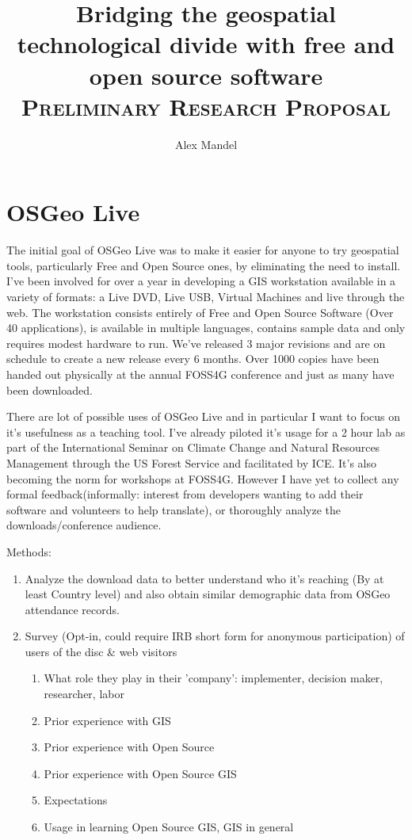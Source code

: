 \documentclass[12pt,letterpaper]{article}
\author{Alex Mandel}
\title{Bridging the geospatial technological divide with free and open source software
\\	
\textsc{\small Preliminary Research Proposal}\\[0.5cm]
}
\begin{document}
\maketitle

\section{OSGeo Live}
The initial goal of OSGeo Live was to make it easier for anyone to try geospatial tools, particularly Free and Open Source ones, by eliminating the need to install.
I've been involved for over a year in developing a GIS workstation available in a variety of formats:
a Live DVD, Live USB, Virtual Machines and live through the web. The workstation consists entirely of Free and Open Source Software (Over 40 applications), is available in multiple languages, contains sample data and only requires modest hardware to run. We've released 3 major revisions and are on schedule to create a new release every 6 months. Over 1000 copies have been handed out physically at the annual FOSS4G conference and just as many have been downloaded.

There are lot of possible uses of OSGeo Live and in particular I want to focus on it's usefulness as a teaching tool. I've already piloted it's usage for a 2 hour lab as part of the International Seminar on Climate Change and Natural Resources Management through the US Forest Service and facilitated by ICE. It's also becoming the norm for workshops at FOSS4G. However I have yet to collect any formal feedback(informally: interest from developers wanting to add their software and volunteers to help translate), or thoroughly analyze the downloads/conference audience.

Methods:
\begin{enumerate}
\item Analyze the download data to better understand who it's reaching (By at least Country level) and also obtain similar demographic data from OSGeo attendance records.
\item Survey (Opt-in, could require IRB short form for anonymous participation) of users of the disc \& web visitors
	\begin{enumerate}
		\item What role they play in their 'company': implementer, decision maker, researcher, labor
		\item Prior experience with GIS
		\item Prior experience with Open Source
		\item Prior experience with Open Source GIS
		\item Expectations
		\item Usage in learning Open Source GIS, GIS in general
	\end{enumerate}
\end{enumerate}
\end{document}
